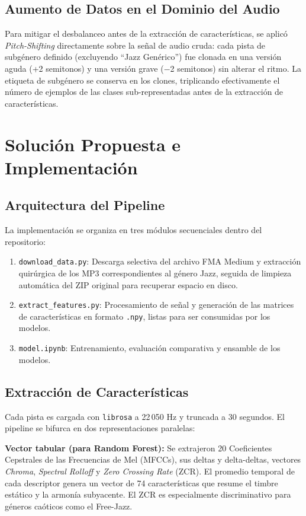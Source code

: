 \documentclass[conference]{IEEEtran}
\begin{document}
\subsection{Aumento de Datos en el Dominio del Audio}
Para mitigar el desbalanceo antes de la extracción de características, se aplicó \textit{Pitch-Shifting} directamente sobre la señal de audio cruda: cada pista de subgénero definido (excluyendo ``Jazz Genérico'') fue clonada en una versión aguda (+2 semitonos) y una versión grave ($-$2 semitonos) sin alterar el ritmo. La etiqueta de subgénero se conserva en los clones, triplicando efectivamente el número de ejemplos de las clases sub-representadas antes de la extracción de características.

\section{Solución Propuesta e Implementación}

\subsection{Arquitectura del Pipeline}
La implementación se organiza en tres módulos secuenciales dentro del repositorio:

\begin{enumerate}
    \item \texttt{download\_data.py}: Descarga selectiva del archivo FMA Medium y extracción quirúrgica de los MP3 correspondientes al género Jazz, seguida de limpieza automática del ZIP original para recuperar espacio en disco.
    \item \texttt{extract\_features.py}: Procesamiento de señal y generación de las matrices de características en formato \texttt{.npy}, listas para ser consumidas por los modelos.
    \item \texttt{model.ipynb}: Entrenamiento, evaluación comparativa y ensamble de los modelos.
\end{enumerate}

\subsection{Extracción de Características}
Cada pista es cargada con \texttt{librosa} \cite{b2} a 22\,050 Hz y truncada a 30 segundos. El pipeline se bifurca en dos representaciones paralelas:

\textbf{Vector tabular (para Random Forest):} Se extrajeron 20 Coeficientes Cepstrales de las Frecuencias de Mel (MFCCs), sus deltas y delta-deltas, vectores \textit{Chroma}, \textit{Spectral Rolloff} y \textit{Zero Crossing Rate} (ZCR). El promedio temporal de cada descriptor genera un vector de 74 características que resume el timbre estático y la armonía subyacente. El ZCR es especialmente discriminativo para géneros caóticos como el Free-Jazz.
\end{document}
